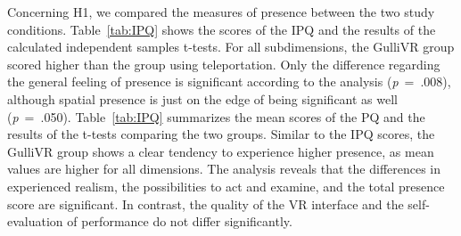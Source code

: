 \documentclass{sigchi}
\begin{document}



Concerning H1, we compared the measures of presence between the two study conditions. Table~\ref{tab:IPQ} shows the scores of the IPQ and the results of the calculated independent samples t-tests. For all subdimensions, the GulliVR group scored higher than the group using teleportation. Only the difference regarding the general feeling of presence is significant according to the analysis (\textit{p}~=~.008), although spatial presence is just on the edge of being significant as well (\textit{p}~=~.050).
Table~\ref{tab:IPQ} summarizes the mean scores of the PQ and the results of the t-tests comparing the two groups. Similar to the IPQ scores, the GulliVR group shows a clear tendency to experience higher presence, as mean values are higher for all dimensions. The analysis reveals that the differences in experienced realism, the possibilities to act and examine, and the total presence score are significant. In contrast, the quality of the VR interface and the self-evaluation of performance do not differ significantly.




\end{document}

